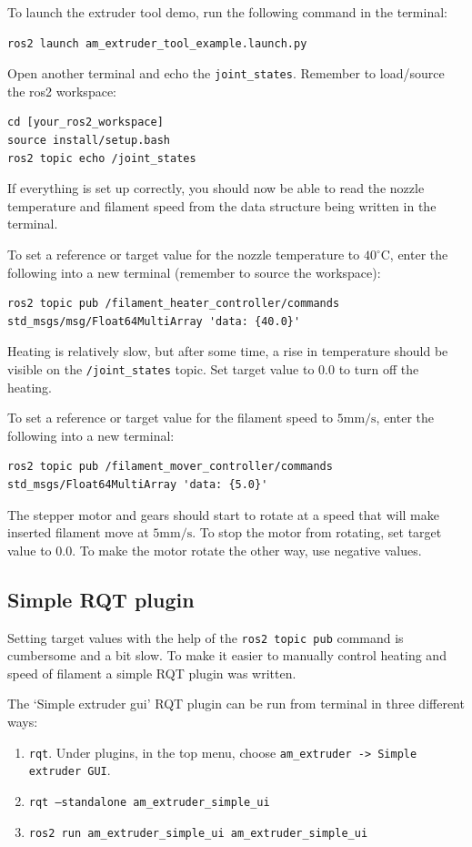 \documentclass[10pt]{article}
\begin{document}
To launch the extruder tool demo, run the following command in the terminal:
\begin{lstlisting}
ros2 launch am_extruder_tool_example.launch.py
\end{lstlisting}

Open another terminal and echo the \texttt{joint\_states}. Remember to load/source the ros2 workspace:
\begin{lstlisting}
cd [your_ros2_workspace]
source install/setup.bash
ros2 topic echo /joint_states
\end{lstlisting}
If everything is set up correctly, you should now be able to read the nozzle temperature and filament speed from the data structure being written in the terminal.

To set a reference or target value for the nozzle temperature to $40^\circ \text{C}$, enter the following into a new terminal (remember to source the workspace):
\begin{lstlisting}
ros2 topic pub /filament_heater_controller/commands std_msgs/msg/Float64MultiArray 'data: {40.0}'
\end{lstlisting}
Heating is relatively slow, but after some time, a rise in temperature should be visible on the \texttt{/joint\_states} topic. Set target value to $0.0$ to turn off the heating.

To set a reference or target value for the filament speed to $5\text{mm/s}$, enter the following into a new terminal:
\begin{lstlisting}
ros2 topic pub /filament_mover_controller/commands std_msgs/Float64MultiArray 'data: {5.0}'
\end{lstlisting}
The stepper motor and gears should start to rotate at a speed that will make inserted filament move at $5 \text{mm/s}$. To stop the motor from rotating, set target value to $0.0$. To make the motor rotate the other way, use negative values.

\subsection{Simple RQT plugin}
Setting target values with the help of the \texttt{ros2 topic pub} command is cumbersome and a bit slow. To make it easier to manually control heating and speed of filament a simple RQT plugin was written.

The `Simple extruder gui' RQT plugin can be run from terminal in three different ways:
\begin{enumerate}
\item \colorbox{backcolor}{\texttt{rqt}}. Under plugins, in the top menu, choose \texttt{am\_extruder -> Simple extruder GUI}.
\item \colorbox{backcolor}{\texttt{rqt --standalone am\_extruder\_simple\_ui}}
\item \colorbox{backcolor}{\texttt{ros2 run am\_extruder\_simple\_ui am\_extruder\_simple\_ui}}
\end{enumerate}
\end{document}
